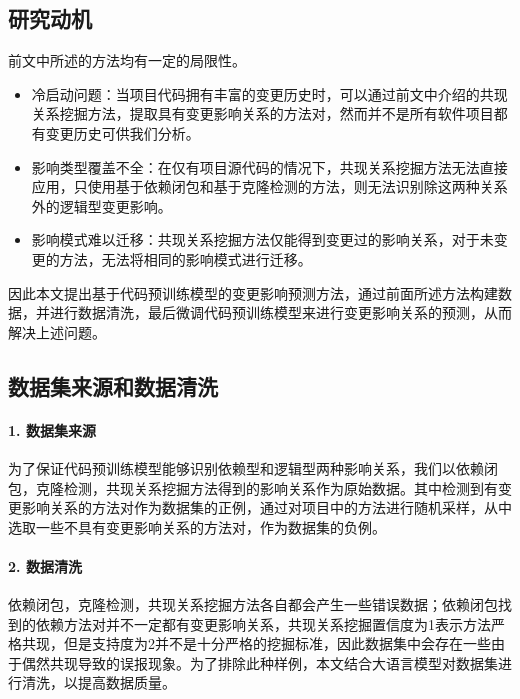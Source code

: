 \subsection{研究动机}

前文中所述的方法均有一定的局限性。

\begin{itemize}

    \item 冷启动问题：当项目代码拥有丰富的变更历史时，可以通过前文中介绍的共现关系挖掘方法，提取具有变更影响关系的方法对，然而并不是所有软件项目都有变更历史可供我们分析。

    \item 影响类型覆盖不全：在仅有项目源代码的情况下，共现关系挖掘方法无法直接应用，只使用基于依赖闭包和基于克隆检测的方法，则无法识别除这两种关系外的逻辑型变更影响。
    
    \item 影响模式难以迁移：共现关系挖掘方法仅能得到变更过的影响关系，对于未变更的方法，无法将相同的影响模式进行迁移。
    
\end{itemize}


因此本文提出基于代码预训练模型的变更影响预测方法，通过前面所述方法构建数据，并进行数据清洗，最后微调代码预训练模型来进行变更影响关系的预测，从而解决上述问题。

\subsection{数据集来源和数据清洗}
\label{1_数据集来源和数据清洗}
\paragraph{1. 数据集来源}

为了保证代码预训练模型能够识别依赖型和逻辑型两种影响关系，我们以依赖闭包，克隆检测，共现关系挖掘方法得到的影响关系作为原始数据。其中检测到有变更影响关系的方法对作为数据集的正例，通过对项目中的方法进行随机采样，从中选取一些不具有变更影响关系的方法对，作为数据集的负例。

\paragraph{2. 数据清洗}

依赖闭包，克隆检测，共现关系挖掘方法各自都会产生一些错误数据；依赖闭包找到的依赖方法对并不一定都有变更影响关系，共现关系挖掘置信度为1表示方法严格共现，但是支持度为2并不是十分严格的挖掘标准，因此数据集中会存在一些由于偶然共现导致的误报现象。为了排除此种样例，本文结合大语言模型对数据集进行清洗，以提高数据质量。


